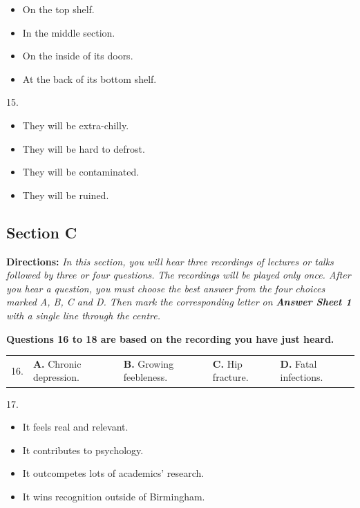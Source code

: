 \documentclass[UTF8,11pt]{ctexart}
\begin{document}
\begin{itemize}[leftmargin=2em,itemsep=.2em,topsep=.4em]\item[A.] On the top shelf.
\item[B.] In the middle section.
\item[C.] On the inside of its doors.
\item[D.] At the back of its bottom shelf.
\end{itemize}

15.


\begin{itemize}[leftmargin=2em,itemsep=.2em,topsep=.4em]\item[A.] They will be extra-chilly.
\item[B.] They will be hard to defrost.
\item[C.] They will be contaminated.
\item[D.] They will be ruined.
\end{itemize}

\subsection*{\textbf{Section C}}


\textbf{Directions:}\textit{ In this section, you will hear three recordings of lectures or talks followed by three or four questions.} \textit{The recordings will be played only once. After you hear a question, you must choose the best answer from the four} \textit{choices marked A, B, C and D. Then mark the corresponding letter on }\textbf{\textit{Answer Sheet 1}}\textit{ with a single line through the} \textit{centre.}


\textbf{Questions 16 to 18 are based on the recording you have just heard.}


\noindent\begin{tabularx}{\linewidth}{@{}lXXXX@{}}16. & \textbf{A.} Chronic depression. & \textbf{B.} Growing feebleness. & \textbf{C.} Hip fracture. & \textbf{D.} Fatal infections.\\\end{tabularx}\par

17.


\begin{itemize}[leftmargin=2em,itemsep=.2em,topsep=.4em]\item[A.] It feels real and relevant.
\item[B.] It contributes to psychology.
\item[C.] It outcompetes lots of academics’ research.
\item[D.] It wins recognition outside of Birmingham.
\end{itemize}
\end{document}
